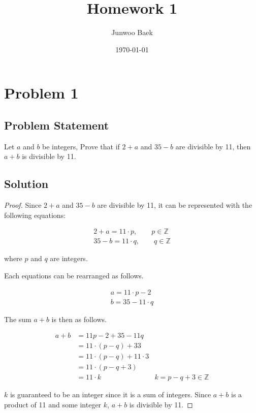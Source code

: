 \documentclass{article}
\title{Homework 1}
\author{Junwoo Baek}
\date{\today}
\begin{document}
\maketitle

\section*{Problem 1}

\subsection*{Problem Statement}
Let $a$ and $b$ be integers, Prove that if $2 + a$ and $35 - b$ are divisible by 11, then $a + b$ is divisible by 11.

\subsection*{Solution}

\begin{proof}
	Since $2 + a$ and $35 - b$ are divisible by 11, it can be represented with the following equations:

	\begin{align*}
		2 + a = 11 \cdot p, \qquad p \in \mathbb{Z} \\
		35 - b = 11 \cdot q, \qquad q \in \mathbb{Z}
	\end{align*}

	where $p$ and $q$ are integers.

	Each equations can be rearranged as follows.

	\begin{align*}
		a = 11 \cdot p - 2 \\
		b = 35 - 11 \cdot q
	\end{align*}

	The sum $a + b$ is then as follows.

	\begin{align*}
		a + b & = 11 p - 2 + 35 - 11q           &                              \\
		      & = 11 \cdot (p - q) + 33         &                              \\
		      & = 11 \cdot (p - q) + 11 \cdot 3 &                              \\
		      & = 11 \cdot (p - q + 3)          &                              \\
		      & = 11 \cdot k                    & k = p - q + 3 \in \mathbb{Z}
	\end{align*}

	$k$ is guaranteed to be an integer since it is a sum of integers.
	Since $a + b$ is a product of 11 and some integer $k$, $a + b$ is divisible by 11.

\end{proof}
\end{document}
